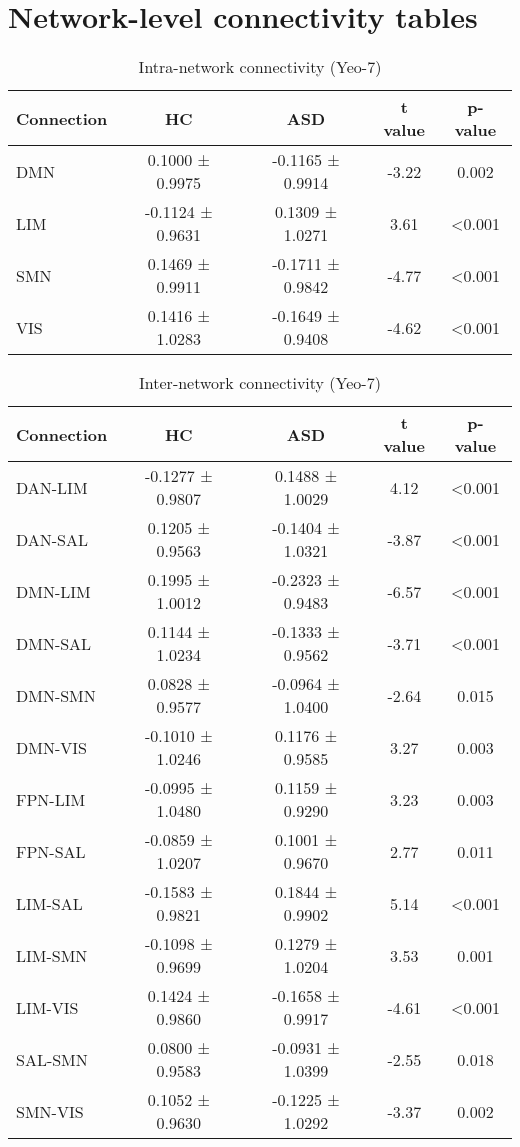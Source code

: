 \documentclass[a4paper,11pt]{article}
\begin{document}
\section*{Network-level connectivity tables}

\begin{table}[h!]
\centering
\caption{Intra-network connectivity (Yeo-7)}
\label{tab:intra\_blocks}
\begin{tabular}{lcccc}
\toprule
Connection & HC & ASD & t value & p-value \\
\midrule
DMN & 0.1000 ± 0.9975 & -0.1165 ± 0.9914 & -3.22 & 0.002 \\
LIM & -0.1124 ± 0.9631 & 0.1309 ± 1.0271 & 3.61 & <0.001 \\
SMN & 0.1469 ± 0.9911 & -0.1711 ± 0.9842 & -4.77 & <0.001 \\
VIS & 0.1416 ± 1.0283 & -0.1649 ± 0.9408 & -4.62 & <0.001 \\
\bottomrule
\end{tabular}
\end{table}

\begin{table}[h!]
\centering
\caption{Inter-network connectivity (Yeo-7)}
\label{tab:inter\_blocks}
\begin{tabular}{lcccc}
\toprule
Connection & HC & ASD & t value & p-value \\
\midrule
DAN-LIM & -0.1277 ± 0.9807 & 0.1488 ± 1.0029 & 4.12 & <0.001 \\
DAN-SAL & 0.1205 ± 0.9563 & -0.1404 ± 1.0321 & -3.87 & <0.001 \\
DMN-LIM & 0.1995 ± 1.0012 & -0.2323 ± 0.9483 & -6.57 & <0.001 \\
DMN-SAL & 0.1144 ± 1.0234 & -0.1333 ± 0.9562 & -3.71 & <0.001 \\
DMN-SMN & 0.0828 ± 0.9577 & -0.0964 ± 1.0400 & -2.64 & 0.015 \\
DMN-VIS & -0.1010 ± 1.0246 & 0.1176 ± 0.9585 & 3.27 & 0.003 \\
FPN-LIM & -0.0995 ± 1.0480 & 0.1159 ± 0.9290 & 3.23 & 0.003 \\
FPN-SAL & -0.0859 ± 1.0207 & 0.1001 ± 0.9670 & 2.77 & 0.011 \\
LIM-SAL & -0.1583 ± 0.9821 & 0.1844 ± 0.9902 & 5.14 & <0.001 \\
LIM-SMN & -0.1098 ± 0.9699 & 0.1279 ± 1.0204 & 3.53 & 0.001 \\
LIM-VIS & 0.1424 ± 0.9860 & -0.1658 ± 0.9917 & -4.61 & <0.001 \\
SAL-SMN & 0.0800 ± 0.9583 & -0.0931 ± 1.0399 & -2.55 & 0.018 \\
SMN-VIS & 0.1052 ± 0.9630 & -0.1225 ± 1.0292 & -3.37 & 0.002 \\
\bottomrule
\end{tabular}
\end{table}
\end{document}
